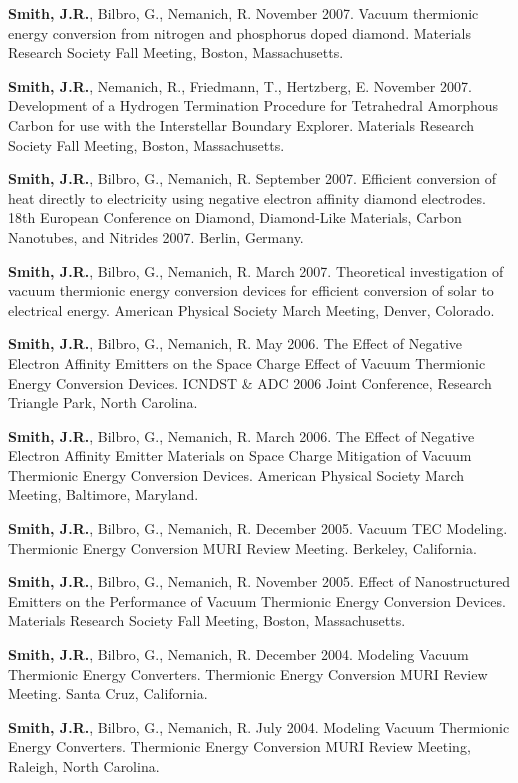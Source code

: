 \textbf{Smith, J.R.}, Bilbro, G., Nemanich, R. November 2007. Vacuum
thermionic energy conversion from nitrogen and phosphorus doped diamond.
Materials Research Society Fall Meeting, Boston, Massachusetts.

\textbf{Smith, J.R.}, Nemanich, R., Friedmann, T., Hertzberg, E.
November 2007. Development of a Hydrogen Termination Procedure for
Tetrahedral Amorphous Carbon for use with the Interstellar Boundary
Explorer. Materials Research Society Fall Meeting, Boston,
Massachusetts.

\textbf{Smith, J.R.}, Bilbro, G., Nemanich, R. September 2007. Efficient
conversion of heat directly to electricity using negative electron
affinity diamond electrodes. 18th European Conference on Diamond,
Diamond-Like Materials, Carbon Nanotubes, and Nitrides 2007. Berlin,
Germany.

\textbf{Smith, J.R.}, Bilbro, G., Nemanich, R. March 2007. Theoretical
investigation of vacuum thermionic energy conversion devices for
efficient conversion of solar to electrical energy. American Physical
Society March Meeting, Denver, Colorado.

\textbf{Smith, J.R.}, Bilbro, G., Nemanich, R. May 2006. The Effect of
Negative Electron Affinity Emitters on the Space Charge Effect of Vacuum
Thermionic Energy Conversion Devices. ICNDST \& ADC 2006 Joint
Conference, Research Triangle Park, North Carolina.

\textbf{Smith, J.R.}, Bilbro, G., Nemanich, R. March 2006. The Effect of
Negative Electron Affinity Emitter Materials on Space Charge Mitigation
of Vacuum Thermionic Energy Conversion Devices. American Physical
Society March Meeting, Baltimore, Maryland.

\textbf{Smith, J.R.}, Bilbro, G., Nemanich, R. December 2005. Vacuum TEC
Modeling. Thermionic Energy Conversion MURI Review Meeting. Berkeley,
California.

\textbf{Smith, J.R.}, Bilbro, G., Nemanich, R. November 2005. Effect of
Nanostructured Emitters on the Performance of Vacuum Thermionic Energy
Conversion Devices. Materials Research Society Fall Meeting, Boston,
Massachusetts.

\textbf{Smith, J.R.}, Bilbro, G., Nemanich, R. December 2004. Modeling
Vacuum Thermionic Energy Converters. Thermionic Energy Conversion MURI
Review Meeting. Santa Cruz, California.

\textbf{Smith, J.R.}, Bilbro, G., Nemanich, R. July 2004. Modeling
Vacuum Thermionic Energy Converters. Thermionic Energy Conversion MURI
Review Meeting, Raleigh, North Carolina.

